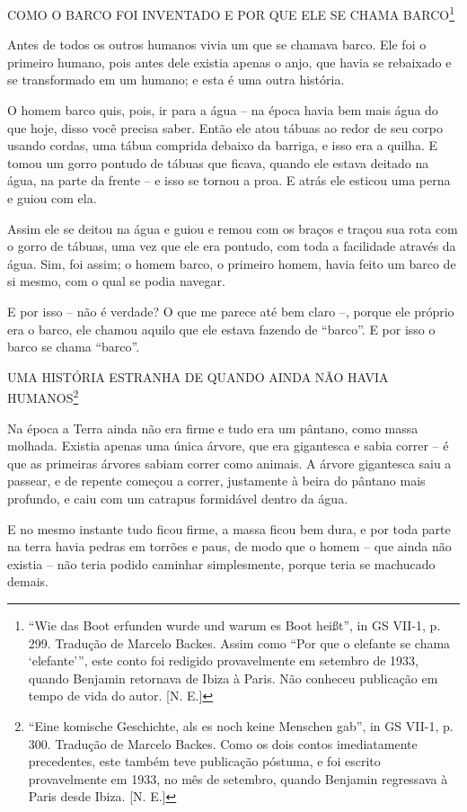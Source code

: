 COMO O BARCO FOI INVENTADO E POR QUE ELE SE CHAMA BARCO\footnote{``Wie
  das Boot erfunden wurde und warum es Boot heißt'', in GS VII-1, p.
  299. Tradução de Marcelo Backes. Assim como ``Por que o elefante se
  chama `elefante''', este conto foi redigido provavelmente em setembro
  de 1933, quando Benjamin retornava de Ibiza à Paris. Não conheceu
  publicação em tempo de vida do autor. {[}N. E.{]}}

Antes de todos os outros humanos vivia um que se chamava barco. Ele foi
o primeiro humano, pois antes dele existia apenas o anjo, que havia se
rebaixado e se transformado em um humano; e esta é uma outra história.

O homem barco quis, pois, ir para a água -- na época havia bem mais água
do que hoje, disso você precisa saber. Então ele atou tábuas ao redor de
seu corpo usando cordas, uma tábua comprida debaixo da barriga, e isso
era a quilha. E tomou um gorro pontudo de tábuas que ficava, quando ele
estava deitado na água, na parte da frente -- e isso se tornou a proa. E
atrás ele esticou uma perna e guiou com ela.

Assim ele se deitou na água e guiou e remou com os braços e traçou sua
rota com o gorro de tábuas, uma vez que ele era pontudo, com toda a
facilidade através da água. Sim, foi assim; o homem barco, o primeiro
homem, havia feito um barco de si mesmo, com o qual se podia navegar.

E por isso -- não é verdade? O que me parece até bem claro --, porque
ele próprio era o barco, ele chamou aquilo que ele estava fazendo de
``barco''. E por isso o barco se chama ``barco''.

UMA HISTÓRIA ESTRANHA DE QUANDO AINDA NÃO HAVIA HUMANOS\footnote{``Eine
  komische Geschichte, als es noch keine Menschen gab'', in GS VII-1, p.
  300. Tradução de Marcelo Backes. Como os dois contos imediatamente
  precedentes, este também teve publicação póstuma, e foi escrito
  provavelmente em 1933, no mês de setembro, quando Benjamin regressava
  à Paris desde Ibiza. {[}N. E.{]}}

Na época a Terra ainda não era firme e tudo era um pântano, como massa
molhada. Existia apenas uma única árvore, que era gigantesca e sabia
correr -- é que as primeiras árvores sabiam correr como animais. A
árvore gigantesca saiu a passear, e de repente começou a correr,
justamente à beira do pântano mais profundo, e caiu com um catrapus
formidável dentro da água.

E no mesmo instante tudo ficou firme, a massa ficou bem dura, e por toda
parte na terra havia pedras em torrões e paus, de modo que o homem --
que ainda não existia -- não teria podido caminhar simplesmente, porque
teria se machucado demais.

